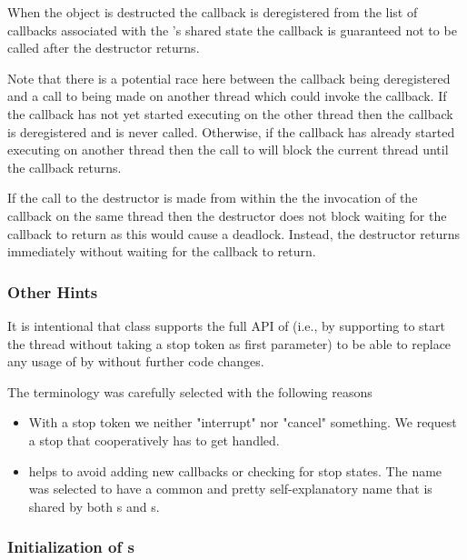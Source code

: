 When the  object is destructed the callback is deregistered
from the list of callbacks associated with the 's shared state
the callback is guaranteed not to be called after the 
destructor returns.

Note that there is a potential race here between the callback being deregistered
and a call to  being made on another thread which could
invoke the callback. If the callback has not yet started executing on the other
thread then the callback is deregistered and is never called. Otherwise, if the
callback has already started executing on another thread then the call to
 will block the current thread until the callback returns.

If the call to the  destructor is made from within the the
invocation of the callback on the same thread then the destructor does not block
waiting for the callback to return as this would cause a deadlock. Instead,
the destructor returns immediately without waiting for the callback to return.

\subsubsection*{Other Hints}

It is intentional that class  supports the full API of 
(i.e., by supporting to start the thread without taking a stop token as first parameter)
to be able to replace any usage of  by 
without further code changes.

The terminology was carefully selected with the following reasons
\begin{itemize}
 \item With a stop token we neither "interrupt" nor "cancel" something.
        We request a stop that cooperatively has to get handled.
 \item {} helps to avoid adding new callbacks
        or checking for stop states.
        The name was selected to have a common and pretty self-explanatory name
        that is shared by both s and s.
\end{itemize}

\subsubsection*{Initialization of s}

